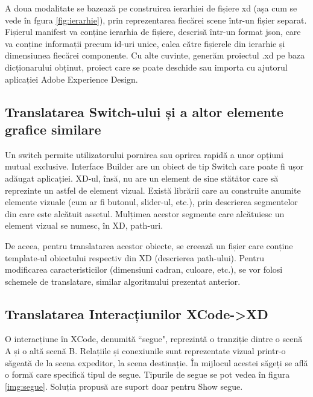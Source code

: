 A doua modalitate se bazează pe construirea ierarhiei de fișiere xd (așa cum se vede în fgura \ref{fig:ierarhie}), prin reprezentarea fiecărei scene într-un fișier separat. Fișierul manifest va conține ierarhia de fișiere, descrisă într-un format json, care va conține informații precum id-uri unice, calea către fișierele din ierarhie și dimensiunea fiecărei componente. Cu alte cuvinte, generăm proiectul .xd pe baza dicționarului obținut, proiect care se poate deschide sau importa cu ajutorul aplicației Adobe Experience Design.

\subsection{Translatarea Switch-ului și a altor elemente grafice similare}

Un switch permite utilizatorului pornirea sau oprirea rapidă a unor opțiuni mutual exclusive. 
Interface Builder are un obiect de tip Switch care poate fi ușor adăugat aplicației. XD-ul, însă, nu are un element de sine stătător care să reprezinte un astfel de element vizual. Există librării care au construite anumite elemente vizuale (cum ar fi butonul, slider-ul, etc.), prin descrierea segmentelor din care este alcătuit assetul. Mulțimea acestor segmente care alcătuiesc un element vizual se numesc, în XD, path-uri.

De aceea, pentru translatarea acestor obiecte, se creează un fișier care conține template-ul obiectului respectiv din XD (descrierea path-ului). Pentru modificarea caracteristicilor (dimensiuni cadran, culoare, etc.), se vor folosi schemele de translatare, similar algoritmului prezentat anterior.

\subsection{Translatarea Interacțiunilor XCode->XD}

O interacțiune în XCode, denumită ``segue", reprezintă o tranziție dintre o scenă A și o altă scenă B. Relațiile și conexiunile sunt reprezentate vizual printr-o săgeată de la scena expeditor, la scena destinație. În mijlocul acestei săgeți se află o formă care specifică tipul de segue. Tipurile de segue se pot vedea în figura \ref{img:segue}. Soluția propusă are suport doar pentru Show segue.



